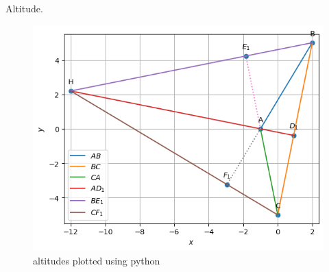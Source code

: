 \begin{table}[H]
        \centering
        
        \caption{Altitude.}
        \label{tab:Altitude}
    \end{table}
\begin{figure}[H]
\includegraphics[width=\columnwidth]{1.3/figs/altitude.png}
\caption{altitudes plotted using python}
\label{fig:i_altitude_py}
\end{figure}

